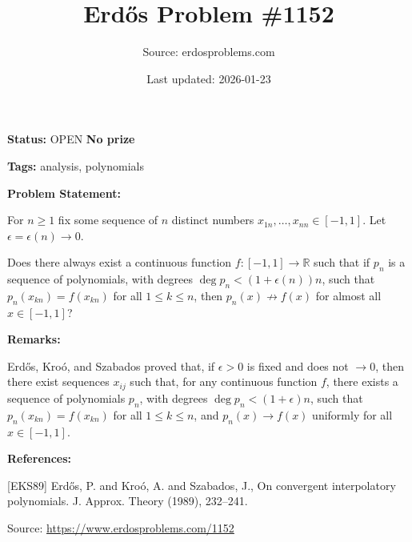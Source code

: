 \documentclass{article}
\title{Erd\H{o}s Problem \#1152}
\date{Last updated: 2026-01-23}
\author{Source: erdosproblems.com}
\begin{document}
\maketitle

\noindent\textbf{Status:} OPEN \quad \textbf{No prize}

\noindent\textbf{Tags:} analysis, polynomials

\medskip
\noindent\textbf{Problem Statement:}

For $n\geq 1$ fix some sequence of $n$ distinct numbers $x_{1n},\ldots,x_{nn}\in [-1,1]$. Let $\epsilon=\epsilon(n)\to 0$. 

Does there always exist a continuous function $f:[-1,1]\to \mathbb{R}$ such that if $p_n$ is a sequence of polynomials, with degrees $\deg p_n<(1+\epsilon(n))n$, such that $p_n(x_{kn})=f(x_{kn})$ for all $1\leq k\leq n$, then $p_n(x)\not\to f(x)$ for almost all $x\in [-1,1]$?

\bigskip
\noindent\textbf{Remarks:}

Erd\H{o}s, Kro\'{o}, and Szabados \cite{EKS89} proved that, if $\epsilon>0$ is fixed and does not $\to 0$, then there exist sequences $x_{ij}$ such that, for any continuous function $f$, there exists a sequence of polynomials $p_n$, with degrees $\deg p_n<(1+\epsilon)n$, such that $p_n(x_{kn})=f(x_{kn})$ for all $1\leq k\leq n$, and $p_n(x)\to f(x)$ uniformly for all $x\in [-1,1]$.

\bigskip
\noindent\textbf{References:}

[EKS89] Erd\H{o}s, P. and Kro\'o, A. and Szabados, J., On convergent interpolatory polynomials. J. Approx. Theory (1989), 232--241.

\bigskip
\noindent\small{Source: \url{https://www.erdosproblems.com/1152}}
\end{document}
